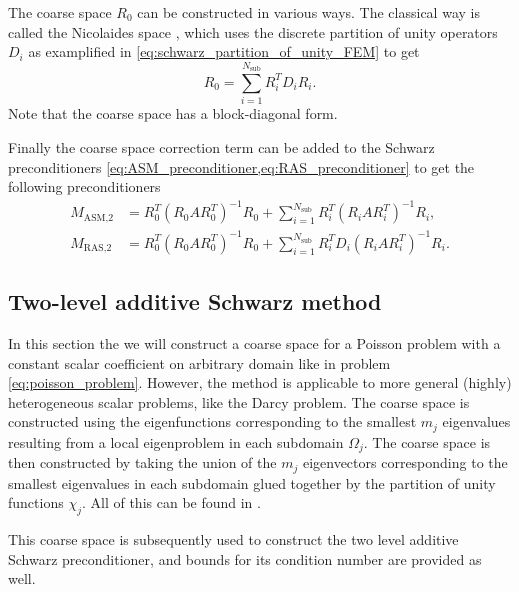 The coarse space $R_0$ can be constructed in various ways. The classical way is called the Nicolaides space \cite[Section 4.2]{schwarz_methods_Dolean_2015}, which uses the discrete partition of unity operators $D_i$ as examplified in \cref{eq:schwarz_partition_of_unity_FEM} to get
\begin{equation}
    R_0 = \sum_{i=1}^{N_{\text{sub}}} R_i^T D_i R_i.
    \label{eq:schwarz_nicolaides_coarse_space}
\end{equation}
Note that the coarse space has a block-diagonal form.

Finally the coarse space correction term can be added to the Schwarz preconditioners \cref{eq:ASM_preconditioner,eq:RAS_preconditioner} to get the following preconditioners
\begin{subequations}
    \begin{align}
        M_{\text{ASM,2}} & = R_0^T (R_0 A R_0^T)^{-1} R_0 + \sum_{i=1}^{N_{\text{sub}}} R_i^T (R_i A R_i^T)^{-1} R_i , \label{eq:ASM_preconditioner_coarse}    \\
        M_{\text{RAS,2}} & = R_0^T (R_0 A R_0^T)^{-1} R_0 + \sum_{i=1}^{N_{\text{sub}}} R_i^T D_i (R_i A R_i^T)^{-1} R_i \label{eq:RAS_preconditioner_coarse}.
    \end{align}
\end{subequations}

\subsection{Two-level additive Schwarz method}
In this section the we will construct a coarse space for a Poisson problem with a constant scalar coefficient on arbitrary domain like in problem \ref{eq:poisson_problem}. However, the method is applicable to more general (highly) heterogeneous scalar problems, like the Darcy problem. The coarse space is constructed using the eigenfunctions corresponding to the smallest $m_j$ eigenvalues resulting from a local eigenproblem in each subdomain $\Omega_j$. The coarse space is then constructed by taking the union of the $m_j$ eigenvectors corresponding to the smallest eigenvalues in each subdomain glued together by the partition of unity functions $\chi_j$. All of this can be found in \cite[Sections 5.1-5.5]{schwarz_methods_Dolean_2015}.

This coarse space is subsequently used to construct the two level additive Schwarz preconditioner, and bounds for its condition number are provided as well.

